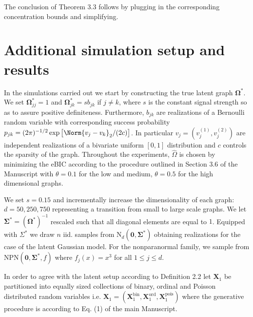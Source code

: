 The conclusion of Theorem 3.3
follows by plugging in the corresponding concentration bounds and simplifying.


\section{Additional simulation setup and results}\label{sec::additional_setup_results}

In the simulations carried out we start by constructing the true latent graph $\boldsymbol{\Omega}^*$. We set $\boldsymbol{\Omega}^*_{jj} = 1$ and $\boldsymbol{\Omega}_{jk}^* = s b_{jk}$ if $j\neq k$, where $s$ is the constant signal strength so as to assure positive definiteness. Furthermore, $b_{jk}$ are realizations of a Bernoulli random variable with corresponding success probability $p_{jk} = (2\pi)^{-1/2} \exp\big[\Norm{v_j - v_k}_2 / (2c) \big]$. In particular $v_j = (v_j^{(1)}, v_j^{(2)})$ are independent realizations of a bivariate uniform $[0,1]$ distribution and $c$ controls the sparsity of the graph. Throughout the experiments, $\hat{\Omega}$ is chosen by minimizing the eBIC according to the procedure outlined in Section 3.6 of the Manuscript %
with $\theta = 0.1$ for the low and medium, $\theta = 0.5$ for the high dimensional graphs.

We set $s = 0.15$ and incrementally increase the dimensionality of each graph: $d= 50,250,750$ representing a transition from small to large scale graphs. We let $\boldsymbol{\Sigma}^* = (\boldsymbol{\Omega}^*)^{-1}$ rescaled such that all diagonal elements are equal to $1$. Equipped with $\Sigma^*$ we draw $n$ iid. samples from $\text{N}_d(\boldsymbol{0}, \boldsymbol{\Sigma}^*)$ obtaining realizations for the case of the latent Gaussian model. For the nonparanormal family, we sample from $\text{NPN}(\boldsymbol{0}, \boldsymbol{\Sigma}^*, f)$ where $f_j(x) = x^3$ for all $1 \leq j \leq d$.

In order to agree with the latent setup according to Definition 2.2
let $\boldsymbol{X}_1$ be partitioned into equally sized collections of binary, ordinal and Poisson distributed random variables i.e. $\boldsymbol{X}_1 = (\boldsymbol{X}_1^{\text{bin}}, \boldsymbol{X}_1^{\text{ord}},\boldsymbol{X}_1^{\text{pois}})$ where the generative procedure is according to Eq. (1) of the main Manuscript. %

